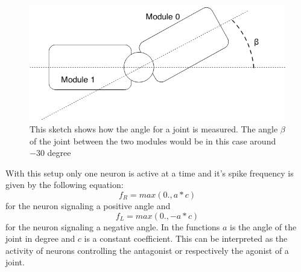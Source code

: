 \begin{figure}[htpb]
  \centering
  \includegraphics[width=\textwidth]{figures/roboAngle.png}
  \caption[Sketch of joint angle]{This sketch shows how the angle for a joint is measured. The angle $\beta$ of the joint between the two modules would be in this case around $-30$ degree}
  \label{fig:robAngle}
\end{figure}


With this setup only one neuron is active at a time and it’s spike frequency is given by the following equation:
\begin{equation}
  f_R = max(0., a * c)
\end{equation}
for the neuron signaling a positive angle and 
\begin{equation}
  f_L = max(0., - a * c)
\end{equation}
for the neuron signaling a negative angle. In the functions $a$ is the angle of the joint in degree and $c$ is a constant coefficient. This can be interpreted as the activity of neurons controlling the antagonist or respectively the agonist of a joint.

